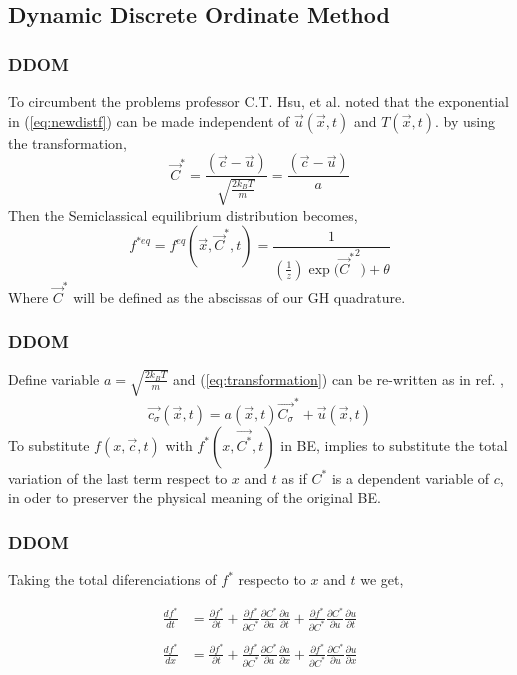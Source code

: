 \subsection{Dynamic Discrete Ordinate Method}
	
\begin{frame}
	\frametitle{DDOM}
	To circumbent the problems professor C.T. Hsu, et al. \cite{Hsu201239} noted that the exponential in (\ref{eq:newdistf}) can be made independent of $\vec{u}(\vec{x},t)$ and $T(\vec{x},t)$. by using the transformation,
	\begin{equation}
	\vec{C}^{*}  = \frac{(\vec{c}-\vec{u})}{\sqrt{\frac{2 k_B T}{m}}} = \frac{(\vec{c}-\vec{u})}{a}
	\label{eq:transformation}
	\end{equation}
	Then the Semiclassical equilibrium distribution becomes,
	\begin{equation}
	f^{*eq} = f^{eq}(\vec{x},\vec{C}^{*},t) = \frac{1}{(\frac{1}{z})\exp{(\vec{C}^{*}}^2)+\theta}
	\label{eq:newdistf}
	\end{equation}
	Where $\vec{C}^{*}$ will be defined as the abscissas of our GH quadrature.
	
\end{frame}

\begin{frame}
	\frametitle{DDOM}
	Define variable $a = \sqrt{\frac{2 k_B T}{m}}$ and (\ref{eq:transformation}) can be re-written as in ref. \cite{Hsu201239},
	\begin{equation}
	\vec{c_\sigma}(\vec{x},t)  = a(\vec{x},t)\vec{C_\sigma}^{*}+\vec{u}(\vec{x},t) 
	\end{equation}
	To substitute $f(x,\vec{c},t)$ with $f^*(x,\vec{C^*},t)$ in BE, implies to substitute the total variation of the last term respect to $x$ and $t$ as if $C^*$ is a dependent variable of $c$, in oder to preserver the physical meaning of the original BE.
\end{frame}

\begin{frame}
	\frametitle{DDOM}
	Taking the total diferenciations of $f^*$ respecto to $x$ and $t$ we get,
			
	\begin{align*}
		\frac{df^*}{dt} &= \frac{\partial{f^*}}{\partial{t}} + 
				\frac{\partial{f^*}}{\partial{C^*}} \frac{\partial{C^*}}{\partial{a}} \frac{\partial{a}}{\partial{t}} + 
				\frac{\partial{f^*}}{\partial{C^*}} \frac{\partial{C^*}}{\partial{u}} \frac{\partial{u}}{\partial{t}}
		\\		
		\\ \frac{df^*}{dx} &= \frac{\partial{f^*}}{\partial{t}} + 
				\frac{\partial{f^*}}{\partial{C^*}} \frac{\partial{C^*}}{\partial{a}} \frac{\partial{a}}{\partial{x}} + 
				\frac{\partial{f^*}}{\partial{C^*}} \frac{\partial{C^*}}{\partial{u}} \frac{\partial{u}}{\partial{x}}
	\end{align*}
\end{frame}

